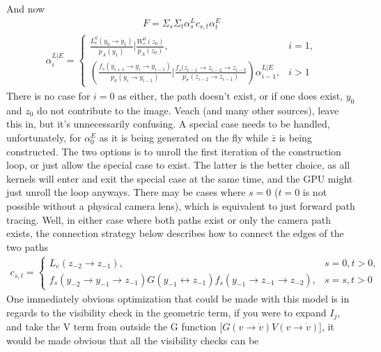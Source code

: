 \documentclass{article}
\begin{document}
    And now
  \begin{align}
    F = \Sigma_s\Sigma_t \alpha^L_s c_{s, t} \alpha^E_t
  \end{align}
  \begin{align}
    \alpha^{L|E}_i =
    \begin{cases}
      \frac{L_e^0(y_0 \rightarrow y_1)}{p_A(y_1)} | \frac{W^0_e(z_0)}{p_A(z_0)},
      &i = 1,\\
      (\frac{f_s(y_{i+1} \rightarrow y_i \rightarrow y_{i-1})}{p_{\sigma}(y_i
      \rightarrow y_{i-1})} | \frac{f_s(z_{i-1} \rightarrow z_{i-2} \rightarrow
      z_{i-3}}{p_\sigma(z_{i-2} \rightarrow z_{i-1})}) \alpha^{L|E}_{i-1},
      &i > 1
    \end{cases}
  \end{align}
    There is no case for $i = 0$ as either, the path doesn't exist, or if one
    does exist, $y_0$ and $z_0$ do not contribute to the image. Veach (and many other
    sources), leave this in, but it's unnecessarily confusing. A special case
    needs to be handled, unfortunately, for $\alpha^E_0$ as it is being
    generated on the fly while $\bar{z}$ is being constructed. The two options
    is to unroll the first iteration of the construction loop, or just allow the
    special case to exist. The latter is the better choice, as all kernels will
    enter and exit the special case at the same time, and the GPU might just
    unroll the loop anyways.
    There may be cases where $s = 0$ ($t = 0$ is not possible without a
    physical camera lens), which is equivalent to just forward path tracing.
    Well, in either case where both paths exist or only the camera path exists,
    the connection strategy below describes how to connect the edges of the two
    paths
  \begin{align}
    c_{s, t} =
    \begin{cases}
      L_e(z_{-2} \rightarrow z_{-1}), &s = 0, t > 0,\\
      f_s(y_{-2} \rightarrow y_{-1} \rightarrow z_{-1}) G(y_{-1} \leftrightarrow
      z_{-1}) f_s(y_{-1} \rightarrow z_{-1} \rightarrow z_{-2}), &s = s, t > 0
    \end{cases}
  \end{align}
    One immediately obvious optimization that could be made with this model is
    in regards to the visibility check in the geometric term, if you were to
    expand $I_j$, and take the V term from outside the G function
    [$G(v \rightarrow
    \dot{v}) V(v \rightarrow \dot{v})$],
    it would be made obvious that all the visibility checks can be
\end{document}

